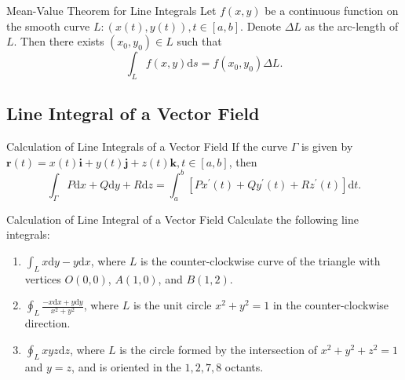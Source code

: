 \begin{theorem}{Mean-Value Theorem for Line Integrals}{}
  Let $f(x, y)$ be a continuous function on the smooth curve
  $L: (x(t), y(t)), t \in [a, b]$.
  Denote $\Delta L$ as the arc-length of $L$.
  Then there exists $(x_0, y_0) \in L$ such that
  \begin{equation}
    \int_L f(x, y)\mathrm{d} s = f(x_0, y_0)\Delta L.
  \end{equation}
\end{theorem}

\subsection{Line Integral of a Vector Field}

\begin{proposition}{Calculation of Line Integrals of a Vector Field}{}
  If the curve $\Gamma$ is given by $\mathbf{r}(t) = x(t)\mathbf{i} +
  y(t)\mathbf{j} + z(t)\mathbf{k}, t \in [a, b]$,
  then
  \begin{equation}
    \int_{\Gamma}P \mathrm{d} x + Q\mathrm{d} y + R\mathrm{d} z
    = \int_a^b \left[ Px^{\prime}(t) + Qy^{\prime}(t) + Rz^{\prime}(t) \right]\mathrm{d} t.
  \end{equation}
\end{proposition}

\begin{example}{Calculation of Line Integral of a Vector Field}{}
  Calculate the following line integrals:
  \begin{enumerate}
  \item $\int_L x\mathrm{d} y - y\mathrm{d} x$, where $L$ is the
    counter-clockwise curve of the triangle with vertices $O(0, 0)$,
    $A(1, 0)$, and $B(1, 2)$.
  \item $\oint_L \frac{-x \mathrm{d} x + y\mathrm{d} y}{x^2 + y^2}$,
    where $L$ is the unit circle $x^2 + y^2 = 1$ in the counter-clockwise direction.
  \item $\oint_L xyz\mathrm{d}z$, where $L$ is the circle formed by
    the intersection of $x^2 + y^2 + z^2 = 1$ and $y = z$,
    and is oriented in the $1,2,7,8$ octants.
  \end{enumerate}
\end{example}

